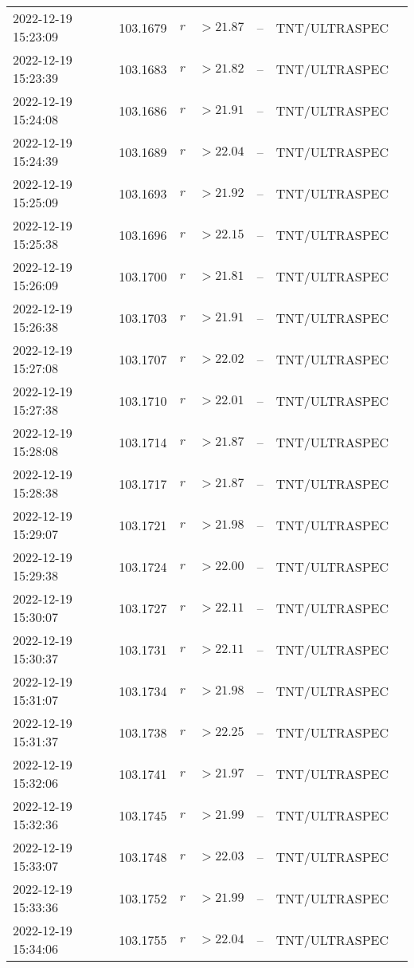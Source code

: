 \documentclass{nature_plusfigure}
\begin{document}
\begin{supplement}
\begin{center}
\begin{longtable}{lllllll}
2022-12-19 15:23:09 & 103.1679 & $r$ & $>21.87$ & -- & TNT/ULTRASPEC &  \\ 
2022-12-19 15:23:39 & 103.1683 & $r$ & $>21.82$ & -- & TNT/ULTRASPEC &  \\ 
2022-12-19 15:24:08 & 103.1686 & $r$ & $>21.91$ & -- & TNT/ULTRASPEC &  \\ 
2022-12-19 15:24:39 & 103.1689 & $r$ & $>22.04$ & -- & TNT/ULTRASPEC &  \\ 
2022-12-19 15:25:09 & 103.1693 & $r$ & $>21.92$ & -- & TNT/ULTRASPEC &  \\ 
2022-12-19 15:25:38 & 103.1696 & $r$ & $>22.15$ & -- & TNT/ULTRASPEC &  \\ 
2022-12-19 15:26:09 & 103.1700 & $r$ & $>21.81$ & -- & TNT/ULTRASPEC &  \\ 
2022-12-19 15:26:38 & 103.1703 & $r$ & $>21.91$ & -- & TNT/ULTRASPEC &  \\ 
2022-12-19 15:27:08 & 103.1707 & $r$ & $>22.02$ & -- & TNT/ULTRASPEC &  \\ 
2022-12-19 15:27:38 & 103.1710 & $r$ & $>22.01$ & -- & TNT/ULTRASPEC &  \\ 
2022-12-19 15:28:08 & 103.1714 & $r$ & $>21.87$ & -- & TNT/ULTRASPEC &  \\ 
2022-12-19 15:28:38 & 103.1717 & $r$ & $>21.87$ & -- & TNT/ULTRASPEC &  \\ 
2022-12-19 15:29:07 & 103.1721 & $r$ & $>21.98$ & -- & TNT/ULTRASPEC &  \\ 
2022-12-19 15:29:38 & 103.1724 & $r$ & $>22.00$ & -- & TNT/ULTRASPEC &  \\ 
2022-12-19 15:30:07 & 103.1727 & $r$ & $>22.11$ & -- & TNT/ULTRASPEC &  \\ 
2022-12-19 15:30:37 & 103.1731 & $r$ & $>22.11$ & -- & TNT/ULTRASPEC &  \\ 
2022-12-19 15:31:07 & 103.1734 & $r$ & $>21.98$ & -- & TNT/ULTRASPEC &  \\ 
2022-12-19 15:31:37 & 103.1738 & $r$ & $>22.25$ & -- & TNT/ULTRASPEC &  \\ 
2022-12-19 15:32:06 & 103.1741 & $r$ & $>21.97$ & -- & TNT/ULTRASPEC &  \\ 
2022-12-19 15:32:36 & 103.1745 & $r$ & $>21.99$ & -- & TNT/ULTRASPEC &  \\ 
2022-12-19 15:33:07 & 103.1748 & $r$ & $>22.03$ & -- & TNT/ULTRASPEC &  \\ 
2022-12-19 15:33:36 & 103.1752 & $r$ & $>21.99$ & -- & TNT/ULTRASPEC &  \\ 
2022-12-19 15:34:06 & 103.1755 & $r$ & $>22.04$ & -- & TNT/ULTRASPEC &  \\ 

\end{longtable}
\end{center}
\end{supplement}
\end{document}
